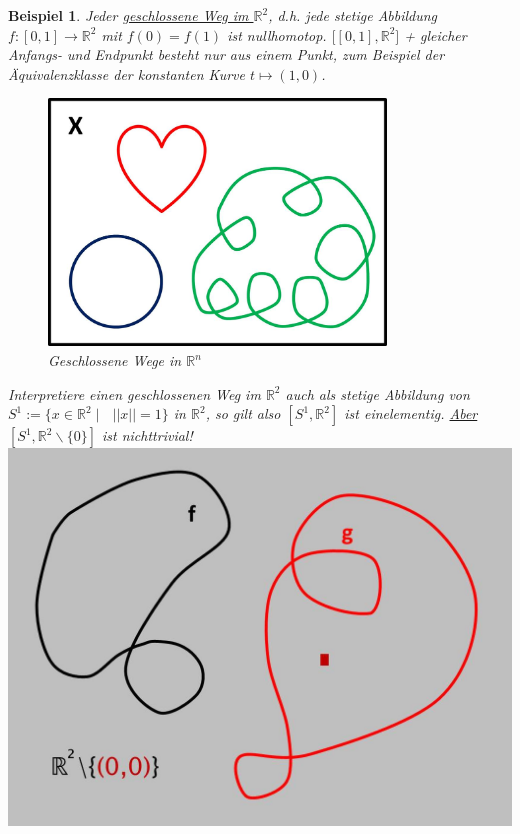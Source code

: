 \documentclass[a4paper,11pt,notitlepage]{report}
\newtheorem{example}{Beispiel}[chapter]
\newcommand{\R}{{\ensuremath{\mathbb{R}}}}
\begin{document}
\begin{example}
Jeder \underline{geschlossene Weg im $\R^2$}, d.h. jede stetige Abbildung $f \colon [0,1] \rightarrow \R^2$ mit $f(0) = f(1)$ ist nullhomotop.
$\bigl[[0,1], \R^2\bigr]$ + gleicher Anfangs- und Endpunkt besteht nur aus einem Punkt, zum Beispiel der Äquivalenzklasse der konstanten Kurve $t \mapsto (1,0)$.

\begin{figure}[h!]
\centering
\includegraphics[width=0.8\textwidth]{images/Geschlossene_Wege.jpg}
\caption{Geschlossene Wege in $\R^n$}
\end{figure}

Interpretiere einen geschlossenen Weg im $\R^2$ auch als stetige Abbildung von $S^1 := \{ x \in \R^2 \mid \text{ } ||x|| = 1\}$ in $\R^2$, so gilt also $[S^1, \R^2]$ ist einelementig.
\newline
\underline{Aber} $[S^1, \R^2 \backslash \{0\}]$ ist nichttrivial!\newline
 \includegraphics[scale=0.5]{images/R2_ohne_0.jpg}
\end{example}
\end{document}
